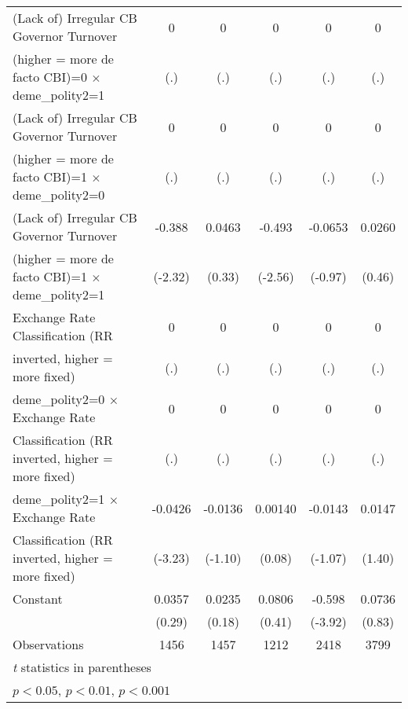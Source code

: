 {\begin{tabular}{l*{5}{c}}
\addlinespace
(Lack of) Irregular CB Governor Turnover&    0         &    0         &    0         &    0         &    0         \\
(higher = more de facto CBI)=0 $\times$ deme\_polity2=1&  (.)         &  (.)         &  (.)         &  (.)         &  (.)         \\
\addlinespace
(Lack of) Irregular CB Governor Turnover&    0         &    0         &    0         &    0         &    0         \\
(higher = more de facto CBI)=1 $\times$ deme\_polity2=0&  (.)         &  (.)         &  (.)         &  (.)         &  (.)         \\
\addlinespace
(Lack of) Irregular CB Governor Turnover&-0.388\sym{*}  &0.0463         &-0.493\sym{*}  &-0.0653         &0.0260         \\
(higher = more de facto CBI)=1 $\times$ deme\_polity2=1&(-2.32)         &(0.33)         &(-2.56)         &(-0.97)         &(0.46)         \\
\addlinespace
Exchange Rate Classification (RR        &    0         &    0         &    0         &    0         &    0         \\
inverted, higher = more fixed)          &  (.)         &  (.)         &  (.)         &  (.)         &  (.)         \\
\addlinespace
deme\_polity2=0 $\times$ Exchange Rate   &    0         &    0         &    0         &    0         &    0         \\
Classification (RR inverted, higher = more fixed)&  (.)         &  (.)         &  (.)         &  (.)         &  (.)         \\
\addlinespace
deme\_polity2=1 $\times$ Exchange Rate   &-0.0426\sym{**} &-0.0136         &0.00140         &-0.0143         &0.0147         \\
Classification (RR inverted, higher = more fixed)&(-3.23)         &(-1.10)         &(0.08)         &(-1.07)         &(1.40)         \\
\addlinespace
Constant                                &0.0357         &0.0235         &0.0806         &-0.598\sym{***}&0.0736         \\
                                        &(0.29)         &(0.18)         &(0.41)         &(-3.92)         &(0.83)         \\
\midrule
Observations                            & 1456         & 1457         & 1212         & 2418         & 3799         \\
\bottomrule
\multicolumn{6}{l}{\footnotesize \textit{t} statistics in parentheses}\\
\multicolumn{6}{l}{\footnotesize \sym{*} \(p<0.05\), \sym{**} \(p<0.01\), \sym{***} \(p<0.001\)}\\
\end{tabular}
}
